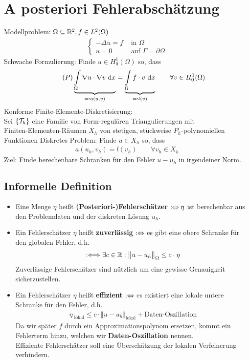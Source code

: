 \section{A posteriori Fehlerabschätzung} %
Modellproblem: $\Omega\subseteq\mathbb{R}^2,f\in L^2(\Omega)$
\begin{align*}
\left\lbrace\begin{array}{rl}
-\Delta u=f &\text{ in }\Omega\\
u=0 &\text{ auf }\Gamma=\partial\Omega
\end{array}\right.
\end{align*}
Schwache Formulierung: Finde $u\in H_0^1(\Omega)$ so, dass
\begin{align*}\label{eqSection6P}\tag{$P$}
	\underbrace{\int\limits_\Omega\nabla u\cdot\nabla v\text{ d} x}_{=:a(u,v)}=\underbrace{\int\limits_\Omega f\cdot v\text{ d} x}_{=:l(v)}\qquad\forall v\in H_0^1(\Omega)
\end{align*}
Konforme Finite-Elemente-Diskretisierung:\\
Sei $\lbrace\mathcal{T}_h\rbrace$ eine Familie von Form-regulären Triangulierungen mit\\ Finiten-Elementen-Räumen $X_h$ von stetigen, stückweise $P_h$-polynomiellen Funktionen\nl
Diskretes Problem: Finde $u\in X_h$ so, dass
\begin{align}\label{eqSection6Ph}\tag{$P_h$}
a(u_h,v_h)=l(v_h)\qquad\forall v_h\in X_h
\end{align}
Ziel: Finde berechenbare Schranken für den Fehler $u-u_h$ in irgendeiner Norm.

\subsection*{Informelle Definition}
\begin{itemize}
\item Eine Menge $\eta$ heißt \textbf{(Posteriori-)Fehlerschätzer} $:\Leftrightarrow\eta$ ist berechenbar aus den Problemdaten und der diskreten Lösung $u_h$.
\item Ein Fehlerschätzer $\eta$ heißt \textbf{zuverlässig} $:\Leftrightarrow$ es gibt eine obere Schranke für den globalen Fehler, d.h.
\begin{align*}
:\Longleftrightarrow\exists c\in\mathbb{R}:\big\Vert u-u_h\big\Vert_\Omega\leq c\cdot\eta
\end{align*}
Zuverlässige Fehlerschätzer sind nützlich um eine gewisse Genauigkeit sicherzustellen.
\item Ein Fehlerschätzer $\eta$ heißt \textbf{effizient} $:\Leftrightarrow$ es existiert eine lokale untere Schranke für den Fehler, d.h.
\begin{align*}
\eta_{\text{ lokal}}\leq c\cdot\big\Vert u-u_h\big\Vert_{\text{lokal}}+\text{Daten-Oszillation}
\end{align*}
Da wir später $f$ durch ein Approximationspolynom ersetzen, kommt ein Fehlerterm hinzu, welchen wir \textbf{Daten-Oszillation} nennen.\\
Effiziente Fehlerschätzer soll eine Überschätzung der lokalen Verfeinerung verhindern.
\end{itemize}

